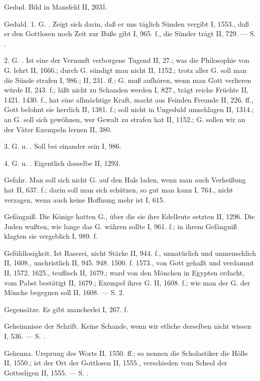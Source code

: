 Gedud. Bild in Mansfeld II, 2031.

Geduld. 1. G. . Zeigt sich darin, daß er uns täglich Sünden vergibt I, 1553., daß er den Gottlosen noch Zeit zur Buße gibt I, 965. f., die Sünder trägt II, 729. — S. .

2. G. . Ist eine der Vernunft verborgene Tugend II, 27.; was die Philosophie von G. lehrt II, 1666.; durch G. sündigt man nicht II, 1152.; trotz aller G. soll man die Sünde strafen I, 986.; II, 231. ff.; G. muß aufhören, wenn man Gott verlieren würde II, 243. f.; läßt nicht zu Schanden werden I, 827., trägt reiche Früchte II, 1421. 1430. f., hat eine allmächtige Kraft, macht aus Feinden Freunde II, 226. ff., Gott belohnt sie herrlich II, 1381. f.; soll nicht in Ungeduld umschlagen II, 1314.; an G. soll sich gewöhnen, wer Gewalt zu strafen hat II, 1152.; G. sollen wir an der Väter Exempeln lernen II, 380.

3. G. u. . Soll bei einander sein I, 986.

4. G. u. . Eigentlich dasselbe II, 1293.

Gefahr. Man soll sich nicht G. auf den Hals laden, wenn man auch Verheißung hat II, 637. f.; darin soll man sich schützen, so gut man kann I, 764., nicht verzagen, wenn auch keine Hoffnung mehr ist I, 615.

Gefängniß. Die Könige hatten G., über die sie ihre Edelleute setzten II, 1296. Die Juden wußten, wie lange das  G. währen sollte I, 961. f.; in ihrem Gefängniß klagten sie vergeblich I, 989. f.

Gefühllosigkeit. Ist Raserei, nicht Stärke II, 944. f., unnatürlich und unmenschlich II, 1608., unchristlich II, 945. 948. 1500. f. 1573., von Gott gehaßt und verdammt II, 1572. 1625., teuflisch II, 1679.; ward von den Mönchen in Egypten erdacht, vom Pabst bestätigt II, 1679.; Exempel ihrer G. II, 1608. f.; wie man der G. der Mönche begegnen soll II, 1608. — S.  2.

Gegensätze. Es gibt mancherlei I, 267. f.

Geheimnisse der Schrift. Keine Schande, wenn wir etliche derselben nicht wissen I, 536. — S. .

Gehenna. Ursprung des Worts II, 1550. ff.; so nennen die Scholastiker die Hölle II, 1550.; ist der Ort der Gottlosen II, 1555., verschieden vom Scheol der Gottseligen II, 1555. — S. .

